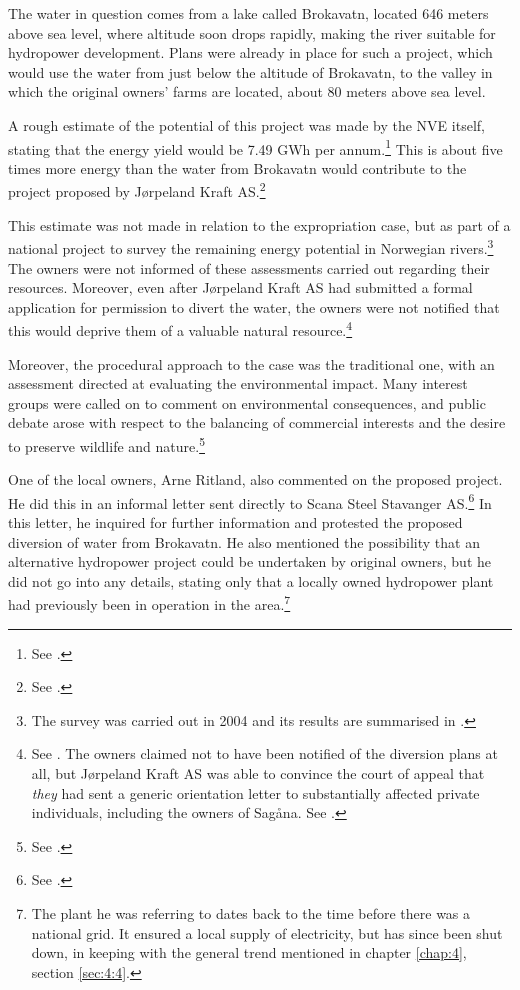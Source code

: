 The water in question comes from a lake called Brokavatn, located 646 meters above sea level, where altitude soon drops rapidly, making the river suitable for hydropower development. Plans were already in place for such a project, which would use the water from just below the altitude of Brokavatn, to the valley in which the original owners' farms are located, about 80 meters above sea level. 

A rough estimate of the potential of this project was made by the NVE itself, stating that the energy yield would be 7.49 GWh per annum.\footnote{See \cite[16]{jorpeland09}.} This is about five times more energy than the water from Brokavatn would contribute to the project proposed by Jørpeland Kraft AS.\footnote{See \cite[19]{jorpeland09}.}

This estimate was not made in relation to the expropriation case, but as part of a national project to survey the remaining energy potential in Norwegian rivers.\footnote{The survey was carried out in 2004 and its results are summarised in \cite{jensen04}.} The owners were not informed of these assessments carried out regarding their resources. Moreover, even after Jørpeland Kraft AS had submitted a formal application for permission to divert the water, the owners were not notified that this would deprive them of a valuable natural resource.\footnote{See \cite[16]{jorpeland09}. The owners claimed not to have been notified of the diversion plans at all, but Jørpeland Kraft AS was able to convince the court of appeal that {\it they} had sent a generic orientation letter to substantially affected private individuals, including the owners of Sagåna. See \cite[5|8]{jorpeland11a}.}

Moreover, the procedural approach to the case was the traditional one, with an assessment directed at evaluating the environmental impact. Many interest groups were called on to comment on environmental consequences, and public debate arose with respect to the balancing of commercial interests and the desire to preserve wildlife and nature.\footnote{See \cite[19]{jorpeland09}.}

One of the local owners, Arne Ritland, also commented on the proposed project. He did this in an informal letter sent directly to Scana Steel Stavanger AS.\footnote{See \cite[17]{jorpeland09}.} In this letter, he inquired for further information and protested the proposed diversion of water from Brokavatn. He also mentioned the possibility that an alternative hydropower project could be undertaken by original owners, but he did not go into any details, stating only that a locally owned hydropower plant had previously been in operation in the area.\footnote{The plant he was referring to dates back to the time before there was a national grid. It ensured a local supply of electricity, but has since been shut down, in keeping with the general trend mentioned in chapter \ref{chap:4}, section \ref{sec:4:4}.}

